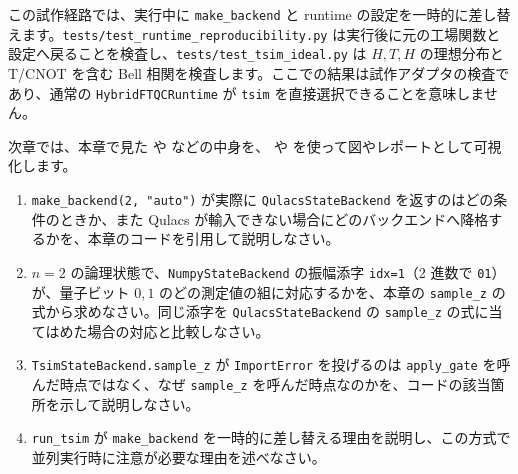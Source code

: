 この試作経路では、実行中に \texttt{make\_backend} と runtime の設定を一時的に差し替えます。\texttt{tests/test\_runtime\_reproducibility.py} は実行後に元の工場関数と設定へ戻ることを検査し、\texttt{tests/test\_tsim\_ideal.py} は $H,T,H$ の理想分布と T/CNOT を含む Bell 相関を検査します。ここでの結果は試作アダプタの検査であり、通常の \texttt{HybridFTQCRuntime} が \texttt{tsim} を直接選択できることを意味しません。

次章では、本章で見た  や  などの中身を、 や  を使って図やレポートとして可視化します。

\begin{exercise}
  \begin{enumerate}
    \item \texttt{make\_backend(2, "auto")} が実際に \texttt{QulacsStateBackend} を返すのはどの条件のときか、また Qulacs が輸入できない場合にどのバックエンドへ降格するかを、本章のコードを引用して説明しなさい。
    \item $n=2$ の論理状態で、\texttt{NumpyStateBackend} の振幅添字 \texttt{idx=1}（2 進数で \texttt{01}）が、量子ビット $0,1$ のどの測定値の組に対応するかを、本章の \texttt{sample\_z} の式から求めなさい。同じ添字を \texttt{QulacsStateBackend} の \texttt{sample\_z} の式に当てはめた場合の対応と比較しなさい。
    \item \texttt{TsimStateBackend.sample\_z} が \texttt{ImportError} を投げるのは \texttt{apply\_gate} を呼んだ時点ではなく、なぜ \texttt{sample\_z} を呼んだ時点なのかを、コードの該当箇所を示して説明しなさい。
    \item \texttt{run\_tsim} が \texttt{make\_backend} を一時的に差し替える理由を説明し、この方式で並列実行時に注意が必要な理由を述べなさい。
  \end{enumerate}
\end{exercise}

